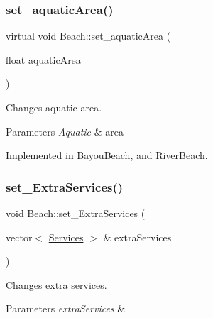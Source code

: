\subsubsection{\texorpdfstring{set\+\_\+aquatic\+Area()}{set\_aquaticArea()}}
{\footnotesize\ttfamily virtual void Beach\+::set\+\_\+aquatic\+Area (\begin{DoxyParamCaption}\item[{float}]{aquatic\+Area }\end{DoxyParamCaption})\hspace{0.3cm}{\ttfamily [pure virtual]}}



Changes aquatic area. 


\begin{DoxyParams}{Parameters}
{\em Aquatic} & area \\
\hline
\end{DoxyParams}


Implemented in \hyperlink{class_bayou_beach_a45c742927ddd735983e92a89c7baba96}{Bayou\+Beach}, and \hyperlink{class_river_beach_ac236cb64cc422eea722bb99fdb29d4d0}{River\+Beach}.

\mbox{\label{class_beach_ae3e07bb07ec9c8b633ecb600c80567f2}} 
\subsubsection{\texorpdfstring{set\+\_\+\+Extra\+Services()}{set\_ExtraServices()}}
{\footnotesize\ttfamily void Beach\+::set\+\_\+\+Extra\+Services (\begin{DoxyParamCaption}\item[{vector$<$ \hyperlink{class_services}{Services} $>$ \&}]{extra\+Services }\end{DoxyParamCaption})}



Changes extra services. 


\begin{DoxyParams}{Parameters}
{\em extra\+Services} & \\
\hline
\end{DoxyParams}
\mbox{\label{class_beach_a68a0fd1f91ee10e6acc9b676274bf2af}} 

